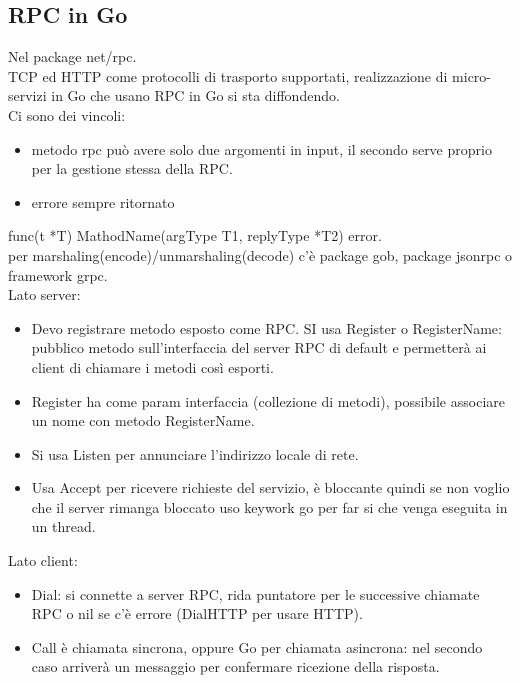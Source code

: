 \documentclass[16px]{article}
\begin{document}
\subsection{RPC in Go}
Nel package net/rpc.\\ TCP ed HTTP come protocolli di trasporto supportati, realizzazione di micro-servizi in Go che usano RPC in Go si sta diffondendo.\\ Ci sono dei vincoli:
\begin{itemize}
\item metodo rpc può avere solo due argomenti in input, il secondo serve proprio per la gestione stessa della RPC.
\item errore sempre ritornato
\end{itemize}
func(t *T) MathodName(argType T1, replyType *T2) error. \\ per marshaling(encode)/unmarshaling(decode) c'è package gob, package jsonrpc o framework grpc.\\ Lato server:
\begin{itemize}
\item Devo registrare metodo esposto come RPC. SI usa Register o RegisterName: pubblico metodo sull'interfaccia del server RPC di default e permetterà ai client di chiamare i metodi così esporti. 
\item Register ha come param interfaccia (collezione di metodi), possibile associare un nome con metodo RegisterName.
\item Si usa Listen per annunciare l'indirizzo locale di rete.
\item Usa Accept per ricevere richieste del servizio, è bloccante quindi se non voglio che il server rimanga bloccato uso keywork go per far si che venga eseguita in un thread. 
\end{itemize}
Lato client:
\begin{itemize}
\item Dial: si connette a server RPC, rida puntatore per le successive chiamate RPC o nil se c'è errore (DialHTTP per usare HTTP).
\item Call è  chiamata sincrona, oppure Go per chiamata asincrona: nel secondo caso arriverà un messaggio per confermare ricezione della risposta.
\end{itemize}
\end{document}
